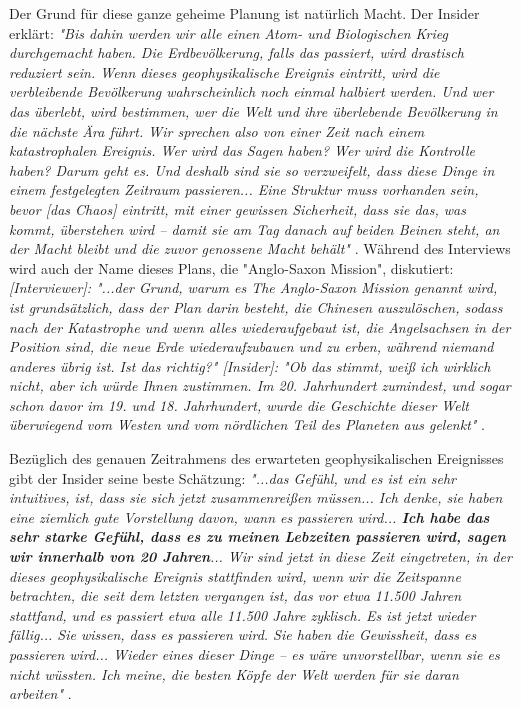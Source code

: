 \documentclass[10pt,twocolumn,letterpaper]{article}
\begin{document}
Der Grund für diese ganze geheime Planung ist natürlich Macht. Der Insider erklärt: \textit{"Bis dahin werden wir alle einen Atom- und Biologischen Krieg durchgemacht haben. Die Erdbevölkerung, falls das passiert, wird drastisch reduziert sein. Wenn dieses geophysikalische Ereignis eintritt, wird die verbleibende Bevölkerung wahrscheinlich noch einmal halbiert werden. Und wer das überlebt, wird bestimmen, wer die Welt und ihre überlebende Bevölkerung in die nächste Ära führt. Wir sprechen also von einer Zeit nach einem katastrophalen Ereignis. Wer wird das Sagen haben? Wer wird die Kontrolle haben? Darum geht es. Und deshalb sind sie so verzweifelt, dass diese Dinge in einem festgelegten Zeitraum passieren... Eine Struktur muss vorhanden sein, bevor [das Chaos] eintritt, mit einer gewissen Sicherheit, dass sie das, was kommt, überstehen wird – damit sie am Tag danach auf beiden Beinen steht, an der Macht bleibt und die zuvor genossene Macht behält"} \cite{4}. Während des Interviews wird auch der Name dieses Plans, die "Anglo-Saxon Mission", diskutiert: \textit{[Interviewer]: "...der Grund, warum es The Anglo-Saxon Mission genannt wird, ist grundsätzlich, dass der Plan darin besteht, die Chinesen auszulöschen, sodass nach der Katastrophe und wenn alles wiederaufgebaut ist, die Angelsachsen in der Position sind, die neue Erde wiederaufzubauen und zu erben, während niemand anderes übrig ist. Ist das richtig?" [Insider]: "Ob das stimmt, weiß ich wirklich nicht, aber ich würde Ihnen zustimmen. Im 20. Jahrhundert zumindest, und sogar schon davor im 19. und 18. Jahrhundert, wurde die Geschichte dieser Welt überwiegend vom Westen und vom nördlichen Teil des Planeten aus gelenkt"} \cite{4}.

Bezüglich des genauen Zeitrahmens des erwarteten geophysikalischen Ereignisses gibt der Insider seine beste Schätzung: \textit{"...das Gefühl, und es ist ein sehr intuitives, ist, dass sie sich jetzt zusammenreißen müssen... Ich denke, sie haben eine ziemlich gute Vorstellung davon, wann es passieren wird... \textbf{Ich habe das sehr starke Gefühl, dass es zu meinen Lebzeiten passieren wird, sagen wir innerhalb von 20 Jahren}... Wir sind jetzt in diese Zeit eingetreten, in der dieses geophysikalische Ereignis stattfinden wird, wenn wir die Zeitspanne betrachten, die seit dem letzten vergangen ist, das vor etwa 11.500 Jahren stattfand, und es passiert etwa alle 11.500 Jahre zyklisch. Es ist jetzt wieder fällig... Sie wissen, dass es passieren wird. Sie haben die Gewissheit, dass es passieren wird... Wieder eines dieser Dinge – es wäre unvorstellbar, wenn sie es nicht wüssten. Ich meine, die besten Köpfe der Welt werden für sie daran arbeiten"} \cite{4}.
\end{document}
